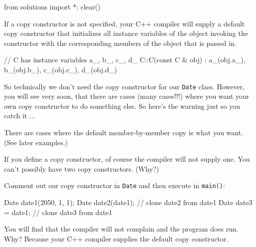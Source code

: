 \begin{python0}
from solutions import *; clear()
\end{python0}

If a copy constructor is not specified, your C++ compiler will supply a
default copy constructor that initializes all instance variables of the
object invoking the constructor with the corresponding members of the
object that is passed in.

\begin{consolethree}[escapeinside=||]
// C has instance variables a_, b_, c_, d_
C::C(const C & obj)
    : a_(obj.a_), b_(obj.b_), c_(obj.c_), d_(obj.d_)
{}
\end{consolethree}

So technically we don't need the copy constructor for our \texttt{Date}
class. However, you will see very soon, that there are cases (many
cases!!!) where you want your own copy constructor to do something else.
So here's the warning just so you catch it ...

 There are cases where the default member-by-member
copy is  what you want. (See later examples.)

If you define a copy constructor, of course the compiler will not supply
one. You can't possibly have two copy constructors. (Why?)

Comment out our copy constructor in \texttt{Date} and then execute in
\texttt{main()}:

\begin{consolethree}[escapeinside=||]
Date date1(2050, 1, 1);
Date date2(date1);  // clone date2 from date1
Date date3 = date1; // clone date3 from date1
\end{consolethree}

You will find that the compiler will not complain and the program does
run. Why? Because your C++ compiler supplies the default copy
constructor.







